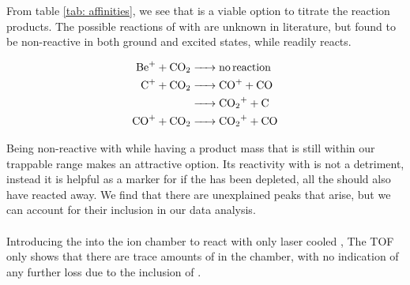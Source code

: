 From table \ref{tab: affinities}, we see that  is a viable option to titrate the reaction products. The possible reactions of  with  are unknown in literature, but found to be non-reactive in both ground and excited states, while  readily reacts.

\begin{align}
	\ce{Be+ + CO2 & -> no reaction} \nonumber \\
	\ce{C+ + CO2 & -> CO+ + CO} \label{r: C+CO2->CO} \\
	\ce{& -> CO2+ + C} \label{r: C+CO2->CO2} \\
	\ce{CO+ + CO2 & -> CO2+ + CO} \label{r: CO+CO2->CO2}
\end{align}

Being non-reactive with  while having a product mass that is still within our trappable range makes  an attractive option. Its reactivity with  is not a detriment, instead it is helpful as a marker for if the  has been depleted, all the  should also have reacted away. We find that there are unexplained peaks that arise, but we can account for their inclusion in our data analysis.
 
%


\paragraph{}
Introducing the  into the ion chamber to react with only laser cooled , The TOF only shows that there are trace amounts of  in the chamber, with no indication of any further loss due to the inclusion of .


